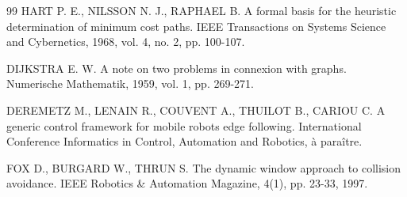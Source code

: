 \begin{thebibliography}{99}
HART P. E., NILSSON N. J., RAPHAEL B. A formal basis for the heuristic determination of minimum cost paths. IEEE Transactions on Systems Science and Cybernetics, 1968, vol. 4, no. 2, pp. 100-107.

DIJKSTRA E. W. A note on two problems in connexion with graphs. Numerische Mathematik, 1959, vol. 1, pp. 269-271.

DEREMETZ M., LENAIN R., COUVENT A., THUILOT B., CARIOU C. A generic control framework for mobile robots edge following. International Conference Informatics in Control, Automation and Robotics, à paraître.

FOX D., BURGARD W., THRUN S. The dynamic window approach to collision avoidance. IEEE Robotics \& Automation Magazine, 4(1), pp. 23-33, 1997.

\end{thebibliography}
